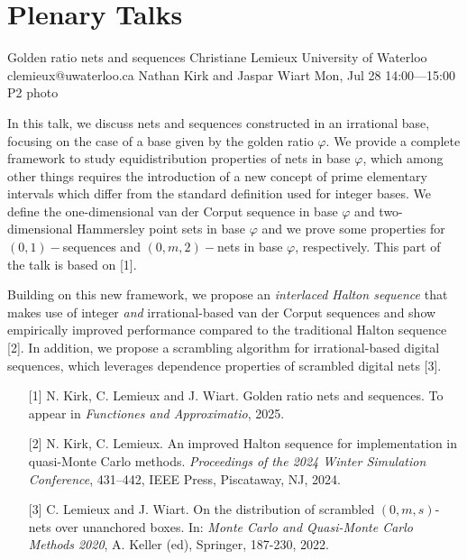 \chapter{Plenary Talks}\newpage

\begin{talk}
  {Golden ratio nets and sequences}%
  {Christiane Lemieux}%
  {University of Waterloo}%
  {clemieux@uwaterloo.ca}%
  {Nathan Kirk and Jaspar Wiart}%
  {}%
  {Mon, Jul 28 14:00---15:00}%
  {P2}%
  {photo}%
  
    
   

In this talk, we discuss nets and sequences constructed in an irrational base, focusing on the case of a base given by the golden ratio $\varphi$. We provide a complete framework to study equidistribution properties of nets in base $\varphi$, which among other things requires the introduction of a new concept of prime elementary intervals which differ from the standard definition used for integer bases. We define the one-dimensional van der Corput sequence in base $\varphi$ and two-dimensional Hammersley point sets in base $\varphi$ and we prove some properties for $(0,1)-$sequences and $(0,m,2)-$nets in base $\varphi$, respectively. This part of the talk is based on [1].


Building on this new framework, we propose 
an {\em interlaced Halton sequence} that makes use of integer \textit{and} irrational-based van der Corput sequences and show empirically improved performance compared to the traditional Halton sequence [2]. In addition, we propose a scrambling algorithm for irrational-based digital sequences, which leverages dependence properties of scrambled digital nets [3].

\medskip

\begin{enumerate}
 \item[{[1]}] N. Kirk, C. Lemieux and J. Wiart. Golden ratio nets and sequences. To appear in {\em Functiones and Approximatio}, 2025.
 \item[{[2]}] N. Kirk, C. Lemieux. An improved Halton sequence for implementation in quasi-Monte Carlo methods. {\em Proceedings of the 2024 Winter Simulation Conference}, 431--442, IEEE Press, Piscataway, NJ, 2024. 
    \item[{[3]}] C. Lemieux and J. Wiart. On the distribution of scrambled $(0, m, s)$-nets over unanchored
boxes. In: {\em Monte Carlo and Quasi-Monte Carlo Methods 2020}, A. Keller (ed), 
Springer, 187-230, 2022.
\end{enumerate}

\end{talk}


